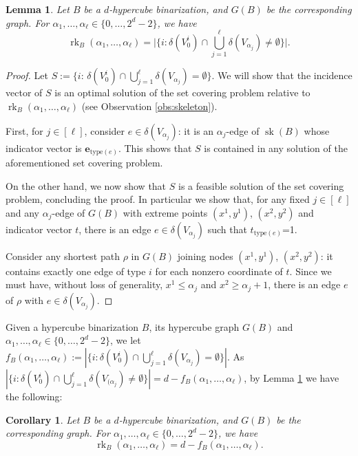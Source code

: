 \documentclass[11pt,a4paper]{article}
\newtheorem{lemma}[theorem]{Lemma}
\newtheorem{corollary}[theorem]{Corollary}
\newcommand{\type}{\mathrm{type}}
\newcommand{\1}{\textbf{1}}
\newcommand{\rk}{\operatorname{rk}}
\newcommand{\sk}{\operatorname{sk}}
\begin{document}
\begin{lemma}\label{lem:logbincube}  
Let $B$ be a $d$-hypercube binarization, and $G(B)$ be the corresponding graph. For $\alpha_1,\dots,\alpha_\ell\in\{0,\dots, 2^d-2\}$, we have
\[\rk_B(\alpha_1,\dots,\alpha_\ell) = \big|\{i:\delta(V_0^i)\cap\textstyle\bigcup_{j=1}^\ell\delta(V_{\alpha_j})\ne \emptyset\}\big|.
\]
\end{lemma}
\begin{proof}
Let $S:=\{i:\,\delta(V_0^i)\cap\textstyle\bigcup_{j=1}^\ell\delta (V_{\alpha_j})=\emptyset\}$.
We will show that the  incidence vector of $S$ is an optimal solution of the set covering problem relative to $\rk_B(\alpha_1,\dots,\alpha_\ell)$ (see Observation \ref{obs:skeleton}).

First, for $j\in [\ell]$, consider $e\in \delta(V_{\alpha_j})$: it is an $\alpha_j$-edge of $\sk(B)$  whose indicator vector is $\mathbf{e}_{\type(e)}$. 
This shows that  $S$ is contained in any solution of the aforementioned set covering problem. 

On the other hand, we now show that $S$ is a feasible solution of the set covering problem, concluding the proof. In particular we show that, for any fixed $j\in [\ell]$ and any $\alpha_j$-edge of $G(B)$ with extreme points $(x^1,y^1)$, $(x^2,y^2)$ and indicator vector $t$,
 there is an edge $e\in \delta(V_{\alpha_j})$ such that $t_{\type(e)}$=1.
 
 Consider any shortest path $\rho$ in $G(B)$ joining nodes $(x^1,y^1)$, $(x^2,y^2)$: it contains exactly one edge of type $i$ for each nonzero coordinate of $t$. Since we must have, without loss of generality, $x^1\leq \alpha_j$ and $x^2\geq \alpha_j+1$, there is an edge $e$ of $\rho$ with $e\in \delta(V_{\alpha_j})$. 
\end{proof}




Given a hypercube binarization $B$, its hypercube graph $G(B)$ and $\alpha_1,\dots,\alpha_{\ell}\in\{0,\dots,2^d-2\}$, we let $f_B(\alpha_1,\dots,\alpha_\ell):=|\{i:\delta(V_0^i)\cap\textstyle\bigcup_{j=1}^\ell\delta(V_{\alpha_j})=\emptyset\}|$.
As   $|\{i:\delta(V_0^i)\cap\textstyle\bigcup_{j=1}^\ell\delta(V_{(\alpha_j})\ne \emptyset\}|=d-f_B(\alpha_1,\dots,\alpha_\ell)$, by Lemma \ref{lem:logbincube} we have the following:


\begin{corollary}\label{cor:rankcube}  
Let $B$ be a $d$-hypercube binarization, and $G(B)$ be the corresponding graph. For $\alpha_1,\dots,\alpha_\ell\in\{0,\dots, 2^d-2\}$, we have
\[\rk_B(\alpha_1,\dots,\alpha_\ell) = d-f_B(\alpha_1,\dots,\alpha_\ell).
\]
\end{corollary}
\end{document}
